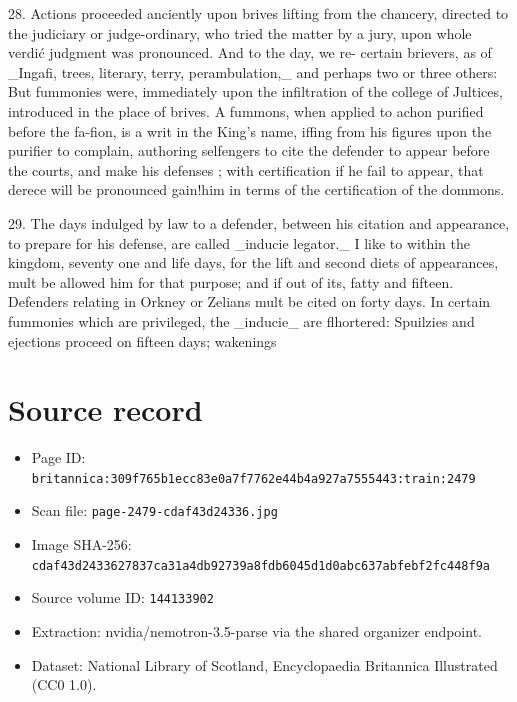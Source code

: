 \documentclass{article}
\begin{document}
28. Actions proceeded anciently upon brives lifting from the chancery, directed to the judiciary or judge-ordinary, who tried the matter by a jury, upon whole verdić judgment was pronounced. And to the day, we re- certain brievers, as of \_Ingafi, trees, literary, terry, perambulation,\_ and perhaps two or three others: But fummonies were, immediately upon the infiltration of the college of Jultices, introduced in the place of brives. A fummons, when applied to achon purified before the fa-fion, is a writ in the King's name, iffing from his figures upon the purifier to complain, authoring selfengers to cite the defender to appear before the courts, and make his defenses ; with certification if he fail to appear, that derece will be pronounced gain!him in terms of the certification of the dommons.

29. The days indulged by law to a defender, between his citation and appearance, to prepare for his defense, are called \_inducie legator.\_ I like to within the kingdom, seventy one and life days, for the lift and second diets of appearances, mult be allowed him for that purpose; and if out of its, fatty and fifteen. Defenders relating in Orkney or Zelians mult be cited on forty days. In certain fummonies which are privileged, the \_inducie\_ are flhortered: Spuilzies and ejections proceed on fifteen days; wakenings

\section*{Source record}
\begin{itemize}
\item Page ID: \texttt{britannica:309f765b1ecc83e0a7f7762e44b4a927a7555443:train:2479}
\item Scan file: \texttt{page-2479-cdaf43d24336.jpg}
\item Image SHA-256: \texttt{cdaf43d2433627837ca31a4db92739a8fdb6045d1d0abc637abfebf2fc448f9a}
\item Source volume ID: \texttt{144133902}
\item Extraction: nvidia/nemotron-3.5-parse via the shared organizer endpoint.
\item Dataset: National Library of Scotland, Encyclopaedia Britannica Illustrated (CC0 1.0).
\end{itemize}
\end{document}
